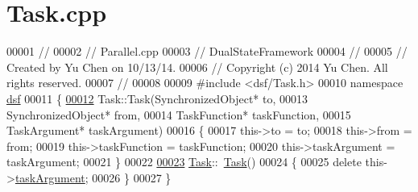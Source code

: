 \hypertarget{_task_8cpp_source}{}\section{Task.\+cpp}
\label{_task_8cpp_source}

\begin{DoxyCode}
00001 \textcolor{comment}{//}
00002 \textcolor{comment}{//  Parallel.cpp}
00003 \textcolor{comment}{//  DualStateFramework}
00004 \textcolor{comment}{//}
00005 \textcolor{comment}{//  Created by Yu Chen on 10/13/14.}
00006 \textcolor{comment}{//  Copyright (c) 2014 Yu Chen. All rights reserved.}
00007 \textcolor{comment}{//}
00008 
00009 \textcolor{preprocessor}{#}\textcolor{preprocessor}{include} \textcolor{preprocessor}{<}\textcolor{preprocessor}{dsf}\textcolor{preprocessor}{/}\textcolor{preprocessor}{Task}\textcolor{preprocessor}{.}\textcolor{preprocessor}{h}\textcolor{preprocessor}{>}
00010 \textcolor{keyword}{namespace} \hyperlink{namespacedsf_aa16e735f29587f4485b56fc46746f7a9}{dsf}
00011 \{
\hypertarget{_task_8cpp_source_l00012}{}\hyperlink{classdsf_1_1_task_afa460a63f94f30df36df5661de1dbe1a}{00012}     Task::Task(SynchronizedObject* to,
00013                SynchronizedObject* from,
00014                TaskFunction* taskFunction,
00015                TaskArgument* taskArgument)
00016     \{
00017         \textcolor{keyword}{this}->to = to;
00018         \textcolor{keyword}{this}->from = from;
00019         \textcolor{keyword}{this}->taskFunction = taskFunction;
00020         \textcolor{keyword}{this}->taskArgument = taskArgument;
00021     \}
00022 
\hypertarget{_task_8cpp_source_l00023}{}\hyperlink{classdsf_1_1_task_a617ffc1b2f418f061fbc168d74ed5a55}{00023}     \hyperlink{namespacedsf_aa16e735f29587f4485b56fc46746f7a9}{Task}::~\hyperlink{namespacedsf_aa16e735f29587f4485b56fc46746f7a9}{Task}()
00024     \{
00025         \textcolor{keyword}{delete} \textcolor{keyword}{this}->\hyperlink{namespacedsf_aa16e735f29587f4485b56fc46746f7a9}{taskArgument};
00026     \}
00027 \}
\end{DoxyCode}
